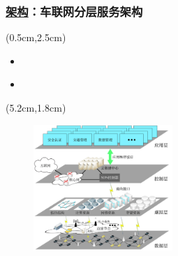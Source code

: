 \begin{frame}
\frametitle{\englishfont \underline{架构}：车联网分层服务架构}
\newBackground
\begin{center}
\begin{textblock*}{\textwidth}(0.5cm,2.5cm)
\begin{itemize}[itemsep=0.2\baselineskip]  \englishfont
	\item[\ding{111}] {}
	\begin{itemize}[itemsep=0.2\baselineskip] 
	\end{itemize}
	\item[\ding{111}]  {\color{cqublue}{分层服务架构}}
	\begin{itemize}[itemsep=0.2\baselineskip] 
	\end{itemize}
\end{itemize}
\end{textblock*}
\end{center}

\begin{center}
\begin{textblock*}{\textwidth}(5.2cm,1.8cm)
\begin{figure}
\includegraphics[width=0.47\textwidth]{fig/Fig2-1-hierarchical-architecture.pdf}
\end{figure}
\end{textblock*}
\end{center}
\end{frame}


